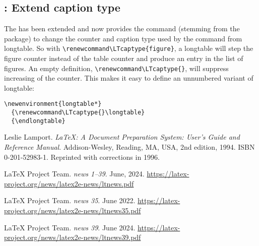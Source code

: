\documentclass{ltnews}
\begin{document}
\subsection{: Extend caption type}

The  has been extended and now provides the command 
(stemming from the  package) to change
the counter and caption type used by the  command from longtable.
So with \verb+\renewcommand\LTcaptype{figure}+, a longtable will step the
figure counter instead of the table counter and produce an
entry in the list of figures. An empty definition, \verb+\renewcommand\LTcaptype{}+,
will suppress increasing of the counter. This makes it easy to define an
unnumbered variant of longtable:
\begin{verbatim}
\newenvironment{longtable*}
  {\renewcommand\LTcaptype{}\longtable}
  {\endlongtable}
\end{verbatim}


\begin{thebibliography}{9}\frenchspacing


Leslie Lamport.
\newblock \emph{{\LaTeX}: {A} Document Preparation System: User's Guide and Reference
  Manual}.
\newblock \mbox{Addison}-Wesley, Reading, MA, USA, 2nd edition, 1994.
\newblock ISBN 0-201-52983-1.
\newblock Reprinted with corrections in 1996.

 \LaTeX{} Project Team.
  \emph{\LaTeXe{} news 1--39}. June, 2024.
  \url{https://latex-project.org/news/latex2e-news/ltnews.pdf}

 \LaTeX{} Project Team.
  \emph{\LaTeXe{} news 35}. June 2022.
  \url{https://latex-project.org/news/latex2e-news/ltnews35.pdf}

 \LaTeX{} Project Team.
  \emph{\LaTeXe{} news 39}. June 2024.
  \url{https://latex-project.org/news/latex2e-news/ltnews39.pdf}

\end{thebibliography}
\end{document}
